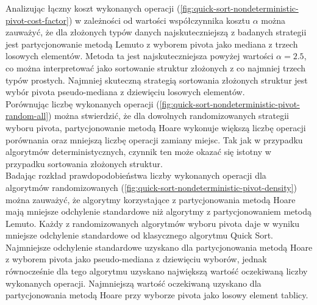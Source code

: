 Analizując łączny koszt wykonanych operacji (\ref{fig:quick-sort-nondeterministic-pivot-cost-factor}) w zależności od wartości współczynnika kosztu $\alpha$ można zauważyć, że dla złożonych typów danych najskuteczniejszą z badanych strategii jest partycjonowanie metodą Lemuto z wyborem pivota jako mediana z trzech losowych elementów. Metoda ta jest najskuteczniejsza powyżej wartości $\alpha = 2.5$, co można interpretować jako sortowanie struktur złożonych z co najmniej trzech typów prostych. Najmniej skuteczną strategią sortowania złożonych struktur jest wybór pivota pseudo-mediana z dziewięciu losowych elementów.\\

Porównując liczbę wykonanych operacji (\ref{fig:quick-sort-nondeterministic-pivot-random-all}) można stwierdzić, że dla dowolnych randomizowanych strategii wyboru pivota, partycjonowanie metodą Hoare wykonuje większą liczbę operacji porównania oraz mniejszą liczbę operacji zamiany miejsc. Tak jak w przypadku algorytmów deterministycznych, czynnik ten może okazać się istotny w przypadku sortowania złożonych struktur.\\

Badając rozkład prawdopodobieństwa liczby wykonanych operacji dla algorytmów randomizowanych (\ref{fig:quick-sort-nondeterministic-pivot-density}) można zauważyć, że algorytmy korzystające z partycjonowania metodą Hoare mają mniejsze odchylenie standardowe niż algorytmy z partycjonowaniem metodą Lemuto. Każdy z randomizowanych algorytmów wyboru pivota daje w wyniku mniejsze odchylenie standardowe od klasycznego algorytmu Quick Sort. Najmniejsze odchylenie standardowe uzyskano dla partycjonowania metodą Hoare z wyborem pivota jako pseudo-mediana z dziewięciu wyborów, jednak równocześnie dla tego algorytmu uzyskano największą wartość oczekiwaną liczby wykonanych operacji. Najmniejszą wartość oczekiwaną uzyskano dla partycjonowania metodą Hoare przy wyborze pivota jako losowy element tablicy.

\begin{figure}[]
	\centering
	
	\caption[]{}
	\label{fig:quick-sort-nondeterministic-pivot-random}
\end{figure}

\begin{figure}[]
	\centering
	
	\caption[]{}
	\label{fig:quick-sort-nondeterministic-pivot-reversed}
\end{figure}

